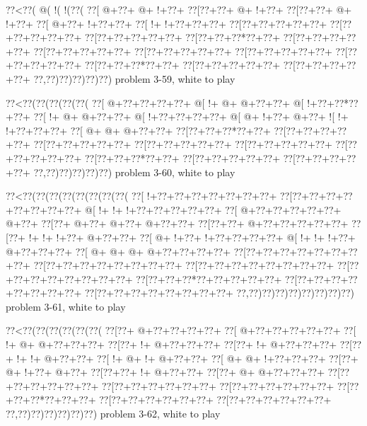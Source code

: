 \vbox{\vbox{\goo
\0??<\0??(\- @(\- !(\- !(\0??(
\0??[\- @+\0??+\- @+\- !+\0??+
\0??[\0??+\0??+\- @+\- !+\0??+
\0??[\0??+\0??+\- @+\- !+\0??+
\0??[\- @+\0??+\- !+\0??+\0??+
\0??[\- !+\- !+\0??+\0??+\0??+
\0??[\0??+\0??+\0??+\0??+\0??+
\0??[\0??+\0??+\0??+\0??+\0??+
\0??[\0??+\0??+\0??+\0??+\0??+
\0??[\0??+\0??+\0??*\0??+\0??+
\0??[\0??+\0??+\0??+\0??+\0??+
\0??[\0??+\0??+\0??+\0??+\0??+
\0??[\0??+\0??+\0??+\0??+\0??+
\0??[\0??+\0??+\0??+\0??+\0??+
\0??[\0??+\0??+\0??+\0??+\0??+
\0??[\0??+\0??+\0??*\0??+\0??+
\0??[\0??+\0??+\0??+\0??+\0??+
\0??[\0??+\0??+\0??+\0??+\0??+
\0??,\0??)\0??)\0??)\0??)\0??)
}
\hfil problem 3-59, white to play\hfil\break
}

\vbox{\vbox{\goo
\0??<\0??(\0??(\0??(\0??(\0??(
\0??[\- @+\0??+\0??+\0??+\0??+
\- @[\- !+\- @+\- @+\0??+\0??+
\- @[\- !+\0??+\0??*\0??+\0??+
\0??[\- !+\- @+\- @+\0??+\0??+
\- @[\- !+\0??+\0??+\0??+\0??+
\- @[\- @+\- !+\0??+\- @+\0??+
\- ![\- !+\- !+\0??+\0??+\0??+
\0??[\- @+\- @+\- @+\0??+\0??+
\0??[\0??+\0??+\0??*\0??+\0??+
\0??[\0??+\0??+\0??+\0??+\0??+
\0??[\0??+\0??+\0??+\0??+\0??+
\0??[\0??+\0??+\0??+\0??+\0??+
\0??[\0??+\0??+\0??+\0??+\0??+
\0??[\0??+\0??+\0??+\0??+\0??+
\0??[\0??+\0??+\0??*\0??+\0??+
\0??[\0??+\0??+\0??+\0??+\0??+
\0??[\0??+\0??+\0??+\0??+\0??+
\0??,\0??)\0??)\0??)\0??)\0??)
}
\hfil problem 3-60, white to play\hfil\break
}

\vbox{\vbox{\goo
\0??<\0??(\0??(\0??(\0??(\0??(\0??(\0??(\0??(
\0??[\- !+\0??+\0??+\0??+\0??+\0??+\0??+\0??+
\0??[\0??+\0??+\0??+\0??+\0??+\0??+\0??+\0??+
\- @[\- !+\- !+\- !+\0??+\0??+\0??+\0??+\0??+
\0??[\- @+\0??+\0??+\0??+\0??+\0??+\- @+\0??+
\0??[\0??+\- @+\0??+\- @+\0??+\- @+\0??+\0??+
\0??[\0??+\0??+\- @+\0??+\0??+\0??+\0??+\0??+
\0??[\0??+\- !+\- !+\- !+\0??+\- @+\0??+\0??+
\0??[\- @+\- !+\0??+\- !+\0??+\0??+\0??+\0??+
\- @[\- !+\- !+\- !+\0??+\- @+\0??+\0??+\0??+
\0??[\- @+\- @+\- @+\- @+\0??+\0??+\0??+\0??+
\0??[\0??+\0??+\0??+\0??+\0??+\0??+\0??+\0??+
\0??[\0??+\0??+\0??+\0??+\0??+\0??+\0??+\0??+
\0??[\0??+\0??+\0??+\0??+\0??+\0??+\0??+\0??+
\0??[\0??+\0??+\0??+\0??+\0??+\0??+\0??+\0??+
\0??[\0??+\0??+\0??*\0??+\0??+\0??+\0??+\0??+
\0??[\0??+\0??+\0??+\0??+\0??+\0??+\0??+\0??+
\0??[\0??+\0??+\0??+\0??+\0??+\0??+\0??+\0??+
\0??,\0??)\0??)\0??)\0??)\0??)\0??)\0??)\0??)
}
\hfil problem 3-61, white to play\hfil\break
}

\vbox{\vbox{\goo
\0??<\0??(\0??(\0??(\0??(\0??(\0??(
\0??[\0??+\- @+\0??+\0??+\0??+\0??+
\0??[\- @+\0??+\0??+\0??+\0??+\0??+
\0??[\- !+\- @+\- @+\0??+\0??+\0??+
\0??[\0??+\- !+\- @+\0??+\0??+\0??+
\0??[\0??+\- !+\- @+\0??+\0??+\0??+
\0??[\0??+\- !+\- !+\- @+\0??+\0??+
\0??[\- !+\- @+\- !+\- @+\0??+\0??+
\0??[\- @+\- @+\- !+\0??+\0??+\0??+
\0??[\0??+\- @+\- !+\0??+\- @+\0??+
\0??[\0??+\0??+\- !+\- @+\0??+\0??+
\0??[\0??+\- @+\- @+\0??+\0??+\0??+
\0??[\0??+\0??+\0??+\0??+\0??+\0??+
\0??[\0??+\0??+\0??+\0??+\0??+\0??+
\0??[\0??+\0??+\0??+\0??+\0??+\0??+
\0??[\0??+\0??+\0??*\0??+\0??+\0??+
\0??[\0??+\0??+\0??+\0??+\0??+\0??+
\0??[\0??+\0??+\0??+\0??+\0??+\0??+
\0??,\0??)\0??)\0??)\0??)\0??)\0??)
}
\hfil problem 3-62, white to play\hfil\break
}

